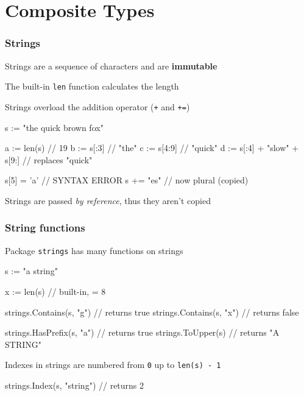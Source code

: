 \documentclass[handout,compress,t,11pt]{beamer}
\begin{document}

\section{Composite Types}

\begin{frame}[fragile]
    \frametitle{Strings}
    Strings are a sequence of characters and are {\bf immutable} \par
    \vspace{0.3\baselineskip}
    The built-in \verb|len| function calculates the length \par
    \vspace{0.3\baselineskip}
    Strings overload the addition operator (\verb|+| and \verb|+=|) \par
\begin{golang}
    s := "the quick brown fox"
    
    a := len(s)                   // 19
    b := s[:3]                    // "the"
    c := s[4:9]                   // "quick"
    d := s[:4] + "slow" + s[9:]   // replaces "quick"
    
    s[5] = 'a'                    // SYNTAX ERROR
    s += "es"                     // now plural (copied)
\end{golang}
    \vspace{0.3\baselineskip}
    Strings are passed {\em by reference}, thus they aren't copied
\end{frame}

\begin{frame}[fragile]
    \frametitle{String functions}
    Package \verb|strings| has many functions on strings
\begin{golang}
s := "a string"

x := len(s)                 // built-in, = 8

strings.Contains(s, "g")    // returns true
strings.Contains(s, "x")    // returns false

strings.HasPrefix(s, "a")   // returns true
strings.ToUpper(s)          // returns "A STRING"
\end{golang}
\vspace{1.5\baselineskip}
Indexes in strings are numbered from \verb|0| up to \verb|len(s) - 1|
\begin{golang}
strings.Index(s, "string")  // returns 2
\end{golang}
\end{frame}
\end{document}
